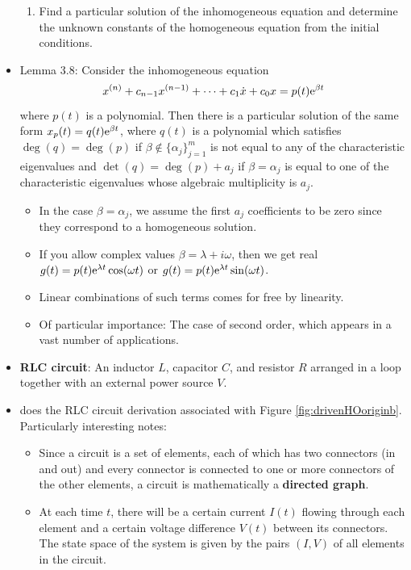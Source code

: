 \documentclass[../notes.tex]{subfiles}
\begin{document}
\begin{itemize}
\begin{enumerate}
        \item Find a particular solution of the inhomogeneous equation and determine the unknown constants of the homogeneous equation from the initial conditions.
    \end{enumerate}
    \item Lemma 3.8: Consider the inhomogeneous equation
    \begin{equation*}
        x^{(n)}+c_{n-1}x^{(n-1)}+\cdots+c_1\dot{x}+c_0x = p(t)\e[\beta t]
    \end{equation*}
    where $p(t)$ is a polynomial. Then there is a particular solution of the same form $x_p(t)=q(t)\e[\beta t]$, where $q(t)$ is a polynomial which satisfies $\deg(q)=\deg(p)$ if $\beta\notin\{\alpha_j\}_{j=1}^m$ is not equal to any of the characteristic eigenvalues and $\det(q)=\deg(p)+a_j$ if $\beta=\alpha_j$ is equal to one of the characteristic eigenvalues whose algebraic multiplicity is $a_j$.
    \begin{itemize}
        \item In the case $\beta=\alpha_j$, we assume the first $a_j$ coefficients to be zero since they correspond to a homogeneous solution.
        \item If you allow complex values $\beta=\lambda+i\omega$, then we get real $g(t)=p(t)\e[\lambda t]\cos(\omega t)$ or $g(t)=p(t)\e[\lambda t]\sin(\omega t)$.
        \item Linear combinations of such terms comes for free by linearity.
        \item Of particular importance: The case of second order, which appears in a vast number of applications.
    \end{itemize}
    \item \textbf{RLC circuit}: An inductor $L$, capacitor $C$, and resistor $R$ arranged in a loop together with an external power source $V$.
    \item \textcite{bib:Teschl} does the RLC circuit derivation associated with Figure \ref{fig:drivenHOoriginb}. Particularly interesting notes:
    \begin{itemize}
        \item Since a circuit is a set of elements, each of which has two connectors (in and out) and every connector is connected to one or more connectors of the other elements, a circuit is mathematically a \textbf{directed graph}.
        \item At each time $t$, there will be a certain current $I(t)$ flowing through each element and a certain voltage difference $V(t)$ between its connectors. The state space of the system is given by the pairs $(I,V)$ of all elements in the circuit.

\end{itemize}
\end{itemize}
\end{document}
